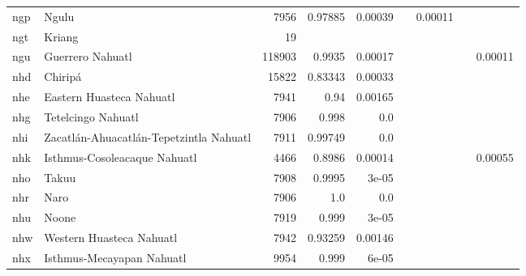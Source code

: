 \documentclass[11pt]{article}
\begin{document}
\begin{table*}[h]
{\begin{tabular}{llrrrrrrr}
ngp         & Ngulu         & 7956         & 0.97885         & 0.00039         &          & 0.00011         &          &          \\

ngt         & Kriang         & 19         &          &          &          &          &          &          \\

ngu         & Guerrero Nahuatl         & 118903         & 0.9935         & 0.00017         &          &          &          & 0.00011         \\

nhd         & Chiripá         & 15822         & 0.83343         & 0.00033         &          &          &          &          \\

nhe         & Eastern Huasteca Nahuatl         & 7941         & 0.94         & 0.00165         &          &          &          &          \\

nhg         & Tetelcingo Nahuatl         & 7906         & 0.998         & 0.0         &          &          &          &          \\

nhi         & Zacatlán-Ahuacatlán-Tepetzintla Nahuatl         & 7911         & 0.99749         & 0.0         &          &          &          &          \\

nhk         & Isthmus-Cosoleacaque Nahuatl         & 4466         & 0.8986         & 0.00014         &          &          &          & 0.00055         \\

nho         & Takuu         & 7908         & 0.9995         & 3e-05         &          &          &          &          \\

nhr         & Naro         & 7906         & 1.0         & 0.0         &          &          &          &          \\

nhu         & Noone         & 7919         & 0.999         & 3e-05         &          &          &          &          \\

nhw         & Western Huasteca Nahuatl         & 7942         & 0.93259         & 0.00146         &          &          &          &          \\

nhx         & Isthmus-Mecayapan Nahuatl         & 9954         & 0.999         & 6e-05         &          &          &          &          \\


\end{tabular}}
\end{table*}
\end{document}

